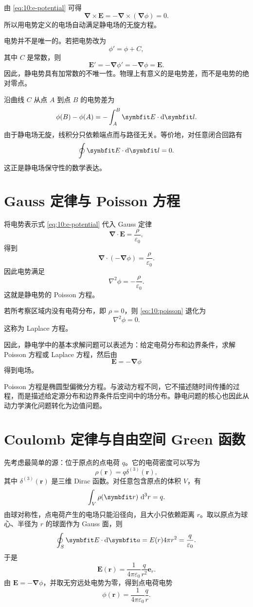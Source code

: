 由 \eqref{eq:10:e-potential} 可得
\[
\bm{\nabla}\times\bm{E}
=
-\bm{\nabla}\times(\bm{\nabla}\phi)
=
0.
\]
所以用电势定义的电场自动满足静电场的无旋方程。

电势并不是唯一的。若把电势改为
\[
\phi'
=
\phi+C,
\]
其中 $C$ 是常数，则
\[
\bm{E}'
=
-\bm{\nabla}\phi'
=
-\bm{\nabla}\phi
=
\bm{E}.
\]
因此，静电势具有加常数的不唯一性。物理上有意义的是电势差，而不是电势的绝对零点。

沿曲线 $C$ 从点 $A$ 到点 $B$ 的电势差为
\[
\phi(B)-\phi(A)
=
-\int_{A}^{B}\bm{E}\cdot\dif\bm{l}.
\]
由于静电场无旋，线积分只依赖端点而与路径无关。等价地，对任意闭合回路有
\[
\oint \bm{E}\cdot\dif\bm{l}=0.
\]
这正是静电场保守性的数学表达。

\section{Gauss 定律与 Poisson 方程}

将电势表示式 \eqref{eq:10:e-potential} 代入 Gauss 定律
\[
\bm{\nabla}\cdot\bm{E}
=
\frac{\rho}{\varepsilon_{0}},
\]
得到
\[
\bm{\nabla}\cdot(-\bm{\nabla}\phi)
=
\frac{\rho}{\varepsilon_{0}}.
\]
因此电势满足
\begin{equation}
	\nabla^{2}\phi
	=
	-\frac{\rho}{\varepsilon_{0}}.
	\label{eq:10:poisson}
\end{equation}
这就是静电势的 Poisson 方程。

若所考察区域内没有电荷分布，即 $\rho=0$，则 \eqref{eq:10:poisson} 退化为
\begin{equation}
	\nabla^{2}\phi=0.
	\label{eq:10:laplace}
\end{equation}
这称为 Laplace 方程。

因此，静电学中的基本求解问题可以表述为：给定电荷分布和边界条件，求解 Poisson 方程或 Laplace 方程，然后由
\[
\bm{E}
=
-\bm{\nabla}\phi
\]
得到电场。

Poisson 方程是椭圆型偏微分方程。与波动方程不同，它不描述随时间传播的过程，而是描述给定源分布和边界条件后空间中的场分布。静电问题的核心也因此从动力学演化问题转化为边值问题。

\section{Coulomb 定律与自由空间 Green 函数}

先考虑最简单的源：位于原点的点电荷 $q$。它的电荷密度可以写为
\[
\rho(\bm{r})
=
q\delta^{(3)}(\bm{r}),
\]
其中 $\delta^{(3)}(\bm{r})$ 是三维 Dirac 函数。对任意包含原点的体积 $V$，有
\[
\int_{V}\rho(\bm{r})\,\dif^{3}r
=
q.
\]
由球对称性，点电荷产生的电场只能沿径向，且大小只依赖距离 $r$。取以原点为球心、半径为 $r$ 的球面作为 Gauss 面，则
\[
\oint_{S}\bm{E}\cdot\dif\bm{a}
=
E(r)4\pi r^{2}
=
\frac{q}{\varepsilon_{0}}.
\]
于是
\[
\bm{E}(\bm{r})
=
\frac{1}{4\pi\varepsilon_{0}}
\frac{q}{r^{2}}\bm{e}_{r}.
\]
由 $\bm{E}=-\bm{\nabla}\phi$，并取无穷远处电势为零，得到点电荷电势
\begin{equation}
	\phi(\bm{r})
	=
	\frac{1}{4\pi\varepsilon_{0}}
	\frac{q}{r}.
	\label{eq:10:point-charge-potential}
\end{equation}

